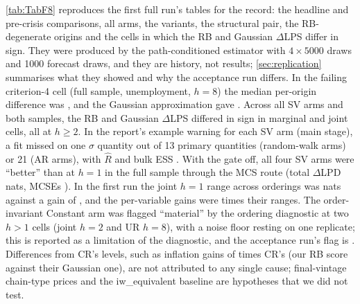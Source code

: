 \cref{tab:TabF8} reproduces the first full run's tables for the record: the headline and
pre-crisis comparisons, all arms, the variants, the structural pair, the RB-degenerate origins and
the cells in which the RB and Gaussian $\Delta$LPS differ in sign.
They were produced by the path-conditioned estimator with $4\times5000$ draws and 1000 forecast
draws, and they are history, not results; \cref{sec:replication} summarises what they
showed and why the acceptance run differs.
In the failing criterion-4 cell (full sample, unemployment, $h = 8$) the median per-origin
difference was , and the Gaussian approximation gave .
Across all SV arms and both samples, the RB and Gaussian $\Delta$LPS differed in sign in 
marginal and  joint cells, all at $h \ge 2$.
In the report's example warning for each SV arm (main stage), a fit missed on one $\sigma$ quantity
out of 13 primary quantities (random-walk arms) or 21 (AR arms), with $\hat R$
 and bulk ESS . With the gate off, all four SV arms were
``better'' than  at $h = 1$ in the full sample through the MCS route (total
$\Delta$LPD  nats, MCSEs ). %
In the first run the joint $h = 1$ range across orderings was  nats against a gain
of , and the per-variable gains were  times their ranges.
The order-invariant Constant arm was flagged ``material'' by the ordering diagnostic at two $h > 1$
cells (joint $h = 2$ and UR $h = 8$), with a noise floor resting on one
replicate; this is reported as a limitation of the diagnostic, and the acceptance run's flag is
.
Differences from CR's levels, such as inflation gains of  times CR's (our RB score
against their Gaussian one), are not attributed to any single cause; final-vintage chain-type prices
and the iw\_equivalent baseline are hypotheses that we did not test. %

